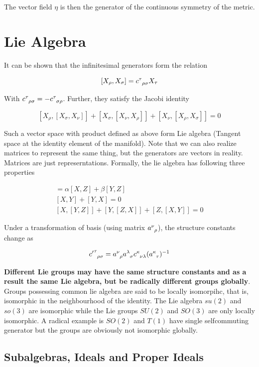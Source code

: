 \documentclass{report}
\begin{document}
\noindent The vector field $\eta$ is then the generator of the continuous symmetry of the metric.

\section{Lie Algebra}

It can be shown that the infinitesimal generators form the relation

$$[X_ \rho, X_\sigma] = c\indices{^{\tau}_ \rho_\sigma}X_\tau$$

\noindent With $c\indices{^\tau_ \rho_\sigma} = -c\indices{^\tau_ \sigma_ \rho}$. Further, they satisfy the Jacobi identity

$$[X_ \rho,[X_\sigma,X_\nu]]+ [X_ \sigma,[X_\nu,X_ \rho]] + [X_ \nu,[X_ \rho,X_\sigma]] = 0 $$

\noindent Such a vector space with product defined as above form Lie algebra (Tangent space at the identity element of the manifold). Note that we can also realize matrices to represent the same thing, but the generators are vectors in reality. Matrices are just represerntations. Formally, the lie algebra has following three properties

\begin{gather}
  [\alpha X + \beta Y, Z] = \alpha[X,Z]+\beta[Y,Z]\\
  [X,Y]+[Y,X] = 0\\
  [X,[Y,Z]]+[Y,[Z,X]]+[Z,[X,Y]] = 0
\end{gather}

\noindent Under a transformation of basis (using matrix $a\indices{^\nu_ \rho}$), the structure constants change as 

$${c'}\indices{^\tau _ \rho_\sigma} = a\indices{^\nu_ \rho}a\indices{^\lambda_ \sigma}c\indices{^\kappa _\nu_\lambda} (a\indices{^\kappa _\tau})^{-1}$$

\noindent \textbf{Different Lie groups may have the same structure constants and as a result the same Lie algebra, but be radically different groups globally}. Groups possessing common lie algebra are said to be locally isomorpihc, that is, isomorphic in the neighbourhood of the identity. The Lie algebra $su(2)$ and $so(3)$ are isomorphic while the Lie groups $SU(2)$ and $SO(3)$ are only locally isomorphic. A radical example is $SO(2)$ and $T(1)$ have single selfcommuting generator but the groups are obviously not isomorphic globally.

\subsection{Subalgebras, Ideals and Proper Ideals}
\end{document}
